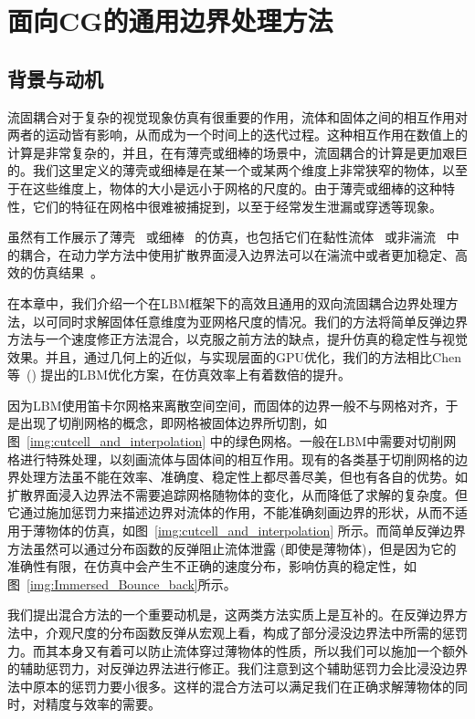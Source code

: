 \chapter{面向CG的通用边界处理方法}
\label{sec:siga21}

\section{背景与动机}
流固耦合对于复杂的视觉现象仿真有很重要的作用，流体和固体之间的相互作用对两者的运动皆有影响，从而成为一个时间上的迭代过程。这种相互作用在数值上的计算是非常复杂的，并且，在有薄壳或细棒的场景中，流固耦合的计算是更加艰巨的。我们这里定义的薄壳或细棒是在某一个或某两个维度上非常狭窄的物体，以至于在这些维度上，物体的大小是远小于网格的尺度的。由于薄壳或细棒的这种特性，它们的特征在网格中很难被捕捉到，以至于经常发生泄漏或穿透等现象。

虽然有工作展示了薄壳~\cite{DiscreteShells,Bridson:2003} 或细棒~\cite{DiscreteRods} 的仿真，也包括它们在黏性流体~\cite{Fei-2018,Takahashi:2019,Fei-2019} 或非湍流~\cite{Azevedo-2016} 中的耦合，在动力学方法中使用扩散界面浸入边界法可以在湍流中或者更加稳定、高效的仿真结果~\cite{Li-2018,Li-2020}。

在本章中，我们介绍一个在LBM框架下的高效且通用的双向流固耦合边界处理方法，以可同时求解固体任意维度为亚网格尺度的情况。我们的方法将简单反弹边界方法与一个速度修正方法混合，以克服之前方法的缺点，提升仿真的稳定性与视觉效果。并且，通过几何上的近似，与实现层面的GPU优化，我们的方法相比Chen等~(\citeyear{Chen-2021}) 提出的LBM优化方案，在仿真效率上有着数倍的提升。

因为LBM使用笛卡尔网格来离散空间空间，而固体的边界一般不与网格对齐，于是出现了切削网格的概念，即网格被固体边界所切割，如图~\ref{img:cutcell_and_interpolation} 中的绿色网格。一般在LBM中需要对切削网格进行特殊处理，以刻画流体与固体间的相互作用。现有的各类基于切削网格的边界处理方法虽不能在效率、准确度、稳定性上都尽善尽美，但也有各自的优势。如扩散界面浸入边界法不需要追踪网格随物体的变化，从而降低了求解的复杂度。但它通过施加惩罚力来描述边界对流体的作用，不能准确刻画边界的形状，从而不适用于薄物体的仿真，如图~\ref{img:cutcell_and_interpolation} 所示。而简单反弹边界方法虽然可以通过分布函数的反弹阻止流体泄露 (即使是薄物体)，但是因为它的准确性有限，在仿真中会产生不正确的速度分布，影响仿真的稳定性，如图~\ref{img:Immersed_Bounce_back}所示。

我们提出混合方法的一个重要动机是，这两类方法实质上是互补的。在反弹边界方法中，介观尺度的分布函数反弹从宏观上看，构成了部分浸没边界法中所需的惩罚力。而其本身又有着可以防止流体穿过薄物体的性质，所以我们可以施加一个额外的辅助惩罚力，对反弹边界法进行修正。我们注意到这个辅助惩罚力会比浸没边界法中原本的惩罚力要小很多。这样的混合方法可以满足我们在正确求解薄物体的同时，对精度与效率的需要。

